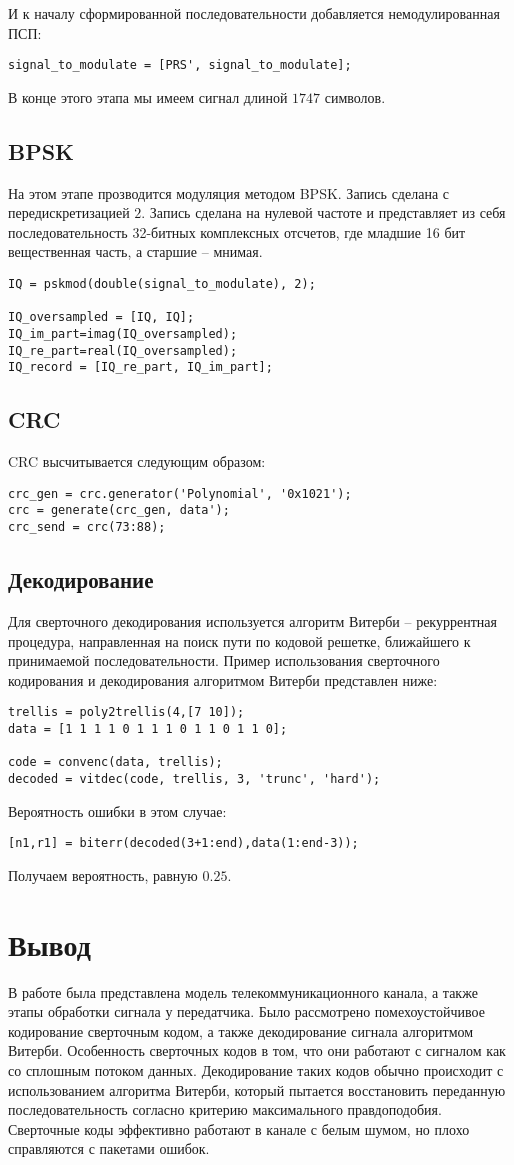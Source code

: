 \documentclass[a4paper]{article}
\begin{document}
И к началу сформированной последовательности добавляется немодулированная ПСП:
\begin{lstlisting}
signal_to_modulate = [PRS', signal_to_modulate];
\end{lstlisting}
В конце этого этапа мы имеем сигнал длиной $1747$ символов.
\subsection{BPSK}
На этом этапе прозводится модуляция методом BPSK. Запись сделана с передискретизацией $2$. Запись сделана на нулевой
частоте и представляет из себя последовательность 32-битных комплексных отсчетов, где младшие 16 бит вещественная
часть, а старшие -- мнимая.
\begin{lstlisting}
IQ = pskmod(double(signal_to_modulate), 2);

IQ_oversampled = [IQ, IQ]; 
IQ_im_part=imag(IQ_oversampled);
IQ_re_part=real(IQ_oversampled);
IQ_record = [IQ_re_part, IQ_im_part];
\end{lstlisting}
\subsection{CRC}
CRC высчитывается следующим образом:
\begin{lstlisting}
crc_gen = crc.generator('Polynomial', '0x1021');
crc = generate(crc_gen, data');
crc_send = crc(73:88);
\end{lstlisting}
\subsection{Декодирование}
Для сверточного декодирования используется алгоритм Витерби -- рекуррентная процедура, направленная на поиск пути по
кодовой решетке, ближайшего к принимаемой последовательности.
Пример использования сверточного кодирования и декодирования алгоритмом Витерби представлен ниже:
\begin{lstlisting}
trellis = poly2trellis(4,[7 10]);
data = [1 1 1 1 0 1 1 1 0 1 1 0 1 1 0];

code = convenc(data, trellis);
decoded = vitdec(code, trellis, 3, 'trunc', 'hard');
\end{lstlisting}
Вероятность ошибки в этом случае:
\begin{lstlisting}
[n1,r1] = biterr(decoded(3+1:end),data(1:end-3));
\end{lstlisting}
Получаем вероятность, равную $0.25$.
\section{Вывод}
В работе была представлена модель телекоммуникационного канала, а также этапы обработки сигнала у передатчика.
Было рассмотрено помехоустойчивое кодирование сверточным кодом, а также декодирование сигнала алгоритмом Витерби.
Особенность сверточных кодов в том, что они работают с сигналом как со сплошным потоком данных. Декодирование таких
кодов обычно происходит с использованием алгоритма Витерби, который пытается восстановить переданную последовательность
согласно критерию максимального правдоподобия. \\
Сверточные коды эффективно работают в канале с белым шумом, но плохо справляются с пакетами ошибок.
\end{document}
